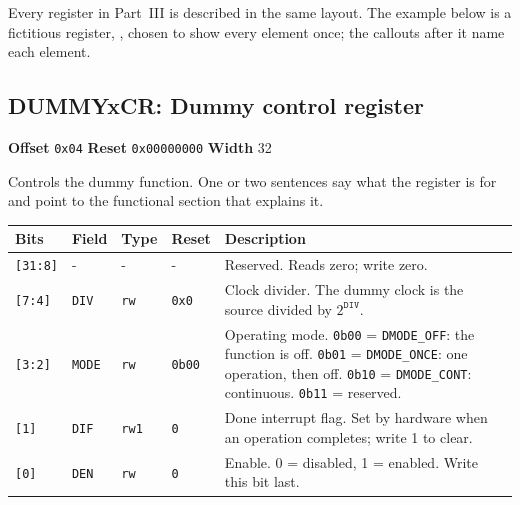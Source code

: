 \documentclass[11pt,pdftex,openany,letterpaper]{report}
\begin{document}
Every register in Part~III is described in the same layout. The example below is a fictitious register, , chosen to show every element once; the callouts after it name each element.

\begin{center}
\begin{minipage}{0.96\linewidth}
\subsection*{DUMMYxCR: Dummy control register}
\noindent \textbf{Offset} \texttt{0x04} \quad \textbf{Reset} \texttt{0x00000000} \quad \textbf{Width} 32

\noindent Controls the dummy function. One or two sentences say what the register is for and point to the functional section that explains it.

\begin{tabularx}{\linewidth}{l l l l X}
\hline \textbf{Bits} & \textbf{Field} & \textbf{Type} & \textbf{Reset} & \textbf{Description} \\ \hline
\texttt{[31:8]} & - & - & - & Reserved. Reads zero; write zero. \\
\rowcolor{tablehighlightcolor} \texttt{[7:4]} & \texttt{DIV} & \texttt{rw} & \texttt{0x0} & Clock divider. The dummy clock is the source divided by $2^{\mathtt{DIV}}$. \\
\texttt{[3:2]} & \texttt{MODE} & \texttt{rw} & \texttt{0b00} & Operating mode. \newline \texttt{0b00} = \texttt{DMODE\_OFF}: the function is off. \newline \texttt{0b01} = \texttt{DMODE\_ONCE}: one operation, then off. \newline \texttt{0b10} = \texttt{DMODE\_CONT}: continuous. \newline \texttt{0b11} = reserved. \\
\rowcolor{tablehighlightcolor} \texttt{[1]} & \texttt{DIF} & \texttt{rw1} & \texttt{0} & Done interrupt flag. Set by hardware when an operation completes; write 1 to clear. \\
\texttt{[0]} & \texttt{DEN} & \texttt{rw} & \texttt{0} & Enable. 0 = disabled, 1 = enabled. Write this bit last. \\
\hline
\end{tabularx}
\end{minipage}
\end{center}
\end{document}
